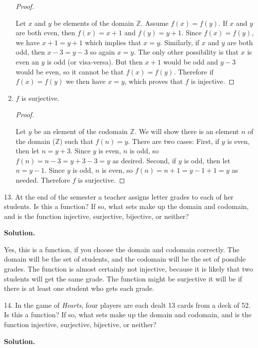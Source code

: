 \documentclass[10pt,]{book}
\theoremstyle{plain}
\theoremstyle{definition}
\theoremstyle{definition}
\theoremstyle{definition}
\numberwithin{equation}{section}
\def\Z{\mathbb Z}
\begin{document}
\begin{exerciselist}
\begin{enumerate}[label=(\alph*)]
              \begin{proof}\hypertarget{proof-1}{}

                  Let \(x\) and \(y\) be elements of the domain \(\Z\). Assume \(f(x) = f(y)\). If \(x\) and \(y\) are both even, then \(f(x) = x+1\) and \(f(y) = y+1\). Since \(f(x) = f(y)\), we have \(x + 1 = y + 1\) which implies that \(x = y\). Similarly, if \(x\) and \(y\) are both odd, then \(x - 3 = y-3\) so again \(x = y\). The only other possibility is that \(x\) is even an \(y\) is odd (or visa-versa). But then \(x + 1\) would be odd and \(y - 3\) would be even, so it cannot be that \(f(x) = f(y)\). Therefore if \(f(x) = f(y)\) we then have \(x = y\), which proves that \(f\) is injective.
\end{proof}
%
\item\hypertarget{li-366}{}\(f\) is surjective.

              \begin{proof}\hypertarget{proof-2}{}

                  Let \(y\) be an element of the codomain \(\Z\). We will show there is an element \(n\) of the domain (\(\Z\)) such that \(f(n) = y\). There are two cases: First, if \(y\) is even, then let \(n = y+3\). Since \(y\) is even, \(n\) is odd, so \(f(n) = n-3 = y+3-3 = y\) as desired. Second, if \(y\) is odd, then let \(n = y-1\). Since \(y\) is odd, \(n\) is even, so \(f(n) = n+1 = y-1+1 = y\) as needed. Therefore \(f\) is surjective.
\end{proof}
%
\end{enumerate}
\item[13.]\hypertarget{exercise-39}{}
            At the end of the semester a teacher assigns letter grades to each of her students. Is this a function? If so, what sets make up the domain and codomain, and is the function injective, surjective, bijective, or neither?
\par\smallskip
\par\smallskip
\noindent\textbf{Solution.}\hypertarget{solution-57}{}\quad

            Yes, this is a function, if you choose the domain and codomain correctly. The domain will be the set of students, and the codomain will be the set of possible grades. The function is almost certainly not injective, because it is likely that two students will get the same grade. The function might be surjective \textendash{} it will be if there is at least one student who gets each grade.
\item[14.]\hypertarget{exercise-40}{}
            In the game of \emph{Hearts}, four players are each dealt 13 cards from a deck of 52. Is this a function? If so, what sets make up the domain and codomain, and is the function injective, surjective, bijective, or neither?
\par\smallskip
\par\smallskip
\noindent\textbf{Solution.}\hypertarget{solution-58}{}\quad


\end{exerciselist}
\end{document}
